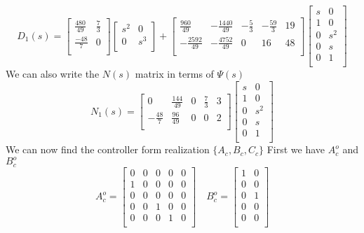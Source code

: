 \documentclass{article}
\begin{document}
$$
D_1(s) =
\begin{bmatrix}
\frac{480}{49} & \frac{7}{3} \\
\frac{-48}{7} & 0\\
\end{bmatrix}
\begin{bmatrix}
s^2 & 0 \\
0 & s^3 \\
\end{bmatrix}
+
\begin{bmatrix}
  \frac{960}{49} & -\frac{1440}{49} & -\frac{5}{3} & -\frac{59}{3} & 19 \\
-\frac{2592}{49} & -\frac{4752}{49} & 0 & 16 & 48 \\
\end{bmatrix}
\begin{bmatrix}
  s & 0 \\
  1 & 0 \\
  0 & s^2 \\
  0 & s \\
  0 & 1 \\
\end{bmatrix}
$$
We can also write the $N(s)$ matrix in terms of $\Psi(s)$
$$
N_1(s) =
\begin{bmatrix}
0 & \frac{144}{49} & 0 & \frac{7}{3} & 3 \\
-\frac{48}{7} & \frac{96}{49} & 0 & 0 & 2 \\
\end{bmatrix}
\begin{bmatrix}
  s & 0 \\
  1 & 0 \\
  0 & s^2 \\
  0 & s \\
  0 & 1 \\
\end{bmatrix}
$$
We can now find the controller form realization $\{A_c,B_c,C_c\}$
First we have $A_c^o$ and $B_c^o$
$$
A_c^o =
\begin{bmatrix}
0 & 0 & 0 & 0 & 0 \\
1 & 0 & 0 & 0 & 0 \\
0 & 0 & 0 & 0 & 0 \\
0 & 0 & 1 & 0 & 0 \\
0 & 0 & 0 & 1 & 0 \\
\end{bmatrix}
\quad
B_c^o =
\begin{bmatrix}
1 & 0 \\
0 & 0 \\
0 & 1 \\
0 & 0 \\
0 & 0 \\
\end{bmatrix}
$$
\end{document}
